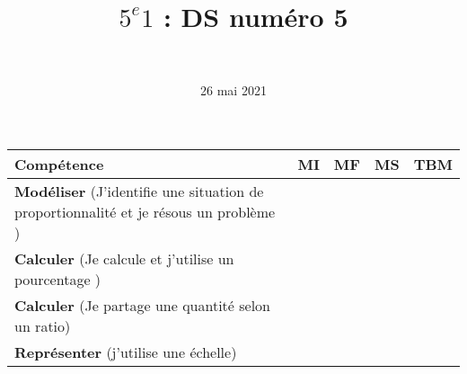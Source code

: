 \documentclass[a4paper,11pt]{exam}
\author{\ }
\date{26 mai 2021}
\title{$5^e 1$ : DS num\'ero 5}
\begin{document}
%	

	\maketitle
%	

\begin{small}
	\begin{center}
		\begin{tabular}{|@{\ }l@{\ }|@{\ }c@{\ }|@{\ }c@{\ }|@{\ }c@{\ }|@{\ }c@{\ }|}
			\hline
			\textbf{Compétence} & \textbf{MI} & \textbf{MF} & \textbf{MS} & \textbf{TBM} \\
			\hline
			\textbf{Modéliser} (J'identifie une situation de proportionnalité et je résous un problème ) &  \ \ & \ \ & \ \ & \ \  \\
			\hline
			\textbf{Calculer} (Je calcule et j'utilise un pourcentage ) &  \ \ & \ \ & \ \ & \ \  \\
			\hline
			\textbf{Calculer} (Je partage une quantité selon un ratio)&  \ \ & \ \ & \ \ & \ \  \\
			\hline	
			\textbf{Représenter} (j’utilise une échelle) & \ \ & \ \ &  \ \  & \ \ \\
			\hline
%			 
		\end{tabular}
	\end{center}
\end{small}	

	





\newpage








\label{LastPage}

%
\end{document}
